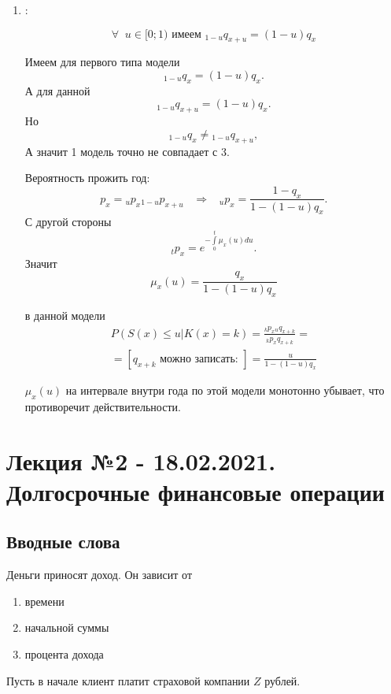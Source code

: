 \begin{enumerate}
	\item {}:

	\[ \forall\;\; u \in [0;1) \text { имеем } {}_{1-u}q_{x+u} = (1-u)q_x \]

	\begin{remark}
		Имеем для первого типа модели
		\[ {}_{1-u}q_x = (1-u)q_x. \]
		А для данной
		\[ {}_{1-u}q_{x+u} = (1-u)q_x.\]
		Но
		\[  {}_{1-u}q_x \neq {}_{1-u}q_{x+u},\]
		А значит 1 модель точно не совпадает с 3.
	\end{remark}
	\begin{mind}
		Вероятность прожить год:
		\[	p_x = {}_up_x{}_{1-u}p_{x+u}\;\;\;\Rightarrow\;\;\; {}_up_x = \frac{1-q_x}{1-(1-u)q_x}.\]
		С другой стороны
		\[  {}_tp_x = e^{-\int\limits^{t}_{0}\mu_x(u)du} .\]
		Значит
		\[  \mu_x(u) = \frac{q_x}{1-(1-u)q_x} \]
	\end{mind}

	 в данной модели
	\begin{gather*}
		P(S(x) \leq u| K(x)=k) = \frac{{}_kp_x{}_uq_{x+k}}{{}_kp_xq_{x+k}}=\\
		=[q_{x+k} \text{ можно записать: } ] = \frac{u}{1-(1-u)q_x}
	\end{gather*}

	\begin{remark}
		$ \mu_x(u)$ на интервале внутри года по этой модели монотонно убывает, что противоречит действительности.
	\end{remark}
\end{enumerate}



\chapter{Лекция №2 - 18.02.2021. Долгосрочные финансовые операции} 
\section{Вводные слова} %


Деньги приносят доход. Он зависит от
\begin{enumerate}
	\item времени
	\item начальной суммы
	\item процента дохода
\end{enumerate}

Пусть в начале клиент платит страховой компании $ Z$ рублей.

